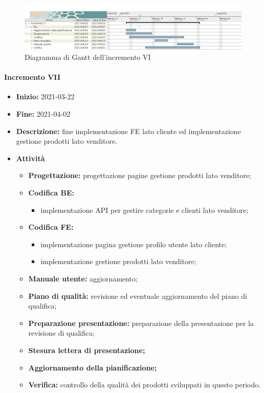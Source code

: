 \begin{figure}[H]
    \centering
    \includegraphics[width=1\linewidth]{res/images/pianificazione/incremento_6.png}
    \caption{Diagramma di Gantt dell'incremento VI}
    \label{fig:_Gantt incremento VI}
\end{figure}

\paragraph[Incremento VII]{Incremento VII}
\begin{itemize}
    \item [] \textbf{Inizio:} 2021-03-22
    \item [] \textbf{Fine:} 2021-04-02
    \item [] \textbf{Descrizione:} fine implementazione FE lato cliente ed implementazione gestione prodotti lato venditore.
    \item [] \textbf{Attività}
          \begin{itemize}
              \item \textbf{Progettazione:} progettazione pagine gestione prodotti lato venditore;
              \item \textbf{Codifica BE:}
                    \begin{itemize}
                        \item implementazione API per gestire categorie e clienti lato venditore;
                    \end{itemize}
              \item \textbf{Codifica FE:}
                    \begin{itemize}
                        \item implementazione pagina gestione profilo utente lato cliente;
                        \item implementazione gestione prodotti lato venditore;
                    \end{itemize}
              \item \textbf{Manuale utente:} aggiornamento;
              \item \textbf{Piano di qualità:} revisione ed eventuale aggiornamento del piano di qualifica;
              \item \textbf{Preparazione presentazione:} preparazione della presentazione per la revisione di qualifica;
              \item \textbf{Stesura lettera di presentazione;}
              \item \textbf{Aggiornamento della pianificazione;}
              \item \textbf{Verifica:} controllo della qualità dei prodotti sviluppati in questo periodo.
          \end{itemize}
\end{itemize}

